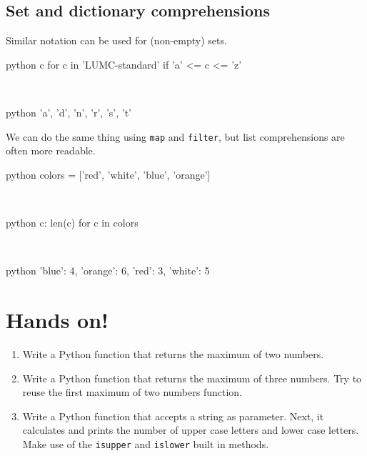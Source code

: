 \documentclass[aspectratio=1610,slidestop]{beamer}
\begin{document}
\subsection{Set and dictionary comprehensions}
\begin{pframe}
 Similar notation can be used for (non-empty) sets.
 \begin{ipython}
  \begin{pythonin}{python}
{c for c in 'LUMC-standard' if 'a' <= c <= 'z'}
  \end{pythonin}
  \\

  \begin{pythonout}{python}
{'a', 'd', 'n', 'r', 's', 't'}
  \end{pythonout}
 \end{ipython}

We can do the same thing using \texttt{map} and \texttt{filter}, but list comprehensions are often more readable.

 \begin{ipython}
  \begin{pythonin}{python}
colors = ['red', 'white', 'blue', 'orange']
  \end{pythonin}
  \\
  \begin{pythonin}{python}
{c: len(c) for c in colors}
  \end{pythonin}
  \\

  \begin{pythonout}{python}
{'blue': 4, 'orange': 6, 'red': 3, 'white': 5}
  \end{pythonout}
 \end{ipython}
\end{pframe}



\section{Hands on!}
\begin{pframe}
 \vspace{-0.5cm}
 \begin{enumerate}
  \item Write a Python function that returns the maximum of two numbers.
  \item Write a Python function that returns the maximum of three numbers.
  Try to reuse the first maximum of two numbers function.
  \item Write a Python function that accepts a string as parameter.
  Next, it calculates and prints the number of upper case letters and lower
  case letters. Make use of the \texttt{isupper} and
  \texttt{islower} built in methods.
 \end{enumerate}
\end{pframe}


\end{document}
